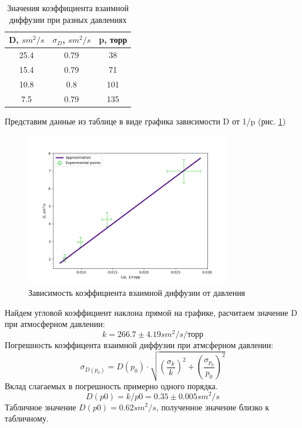 \documentclass[a4paper,12pt]{article} %
\begin{document}
\begin{table} \label{D} \caption{Значения коэффициента взаимной диффузии при разных давлениях} 
\begin{tabular}{|c|c|c|} \hline D, $sm^2/s$&	$\sigma_D$, $sm^2/s$ & p, торр \\ \hline 
25.4 & 0.79 & 38 \\ \hline
15.4 & 0.79 & 71  \\ \hline
10.8 & 0.8 & 101 \\ \hline
7.5  & 0.79 & 135 \\ \hline 
\end{tabular} \end{table}
Представим данные из таблице в виде графика зависимости D от 1/p (рис. \ref{D_p})

\begin{figure}[h!]
\begin{center}
\includegraphics[width=0.8\textwidth]{D(p)}
\end{center}
\caption{Зависимость коэффициента взаимной диффузии от давления} \label{D_p}
\end{figure}

Найдем угловой коэффициент наклона прямой на графике, расчитаем значение D при атмосферном давлении:
\begin{equation}
k = 266.7 \pm 4.19 sm^2/s/\text{торр}
\end{equation}
Погрешность коэффицента взаимной диффузии при атмсферном давлении:
\begin{equation}
\sigma_{D(p_0)}=D(p_0)\cdot \sqrt{(\frac{\sigma_k}{k})^2
+(\frac{\sigma_{p_0}}{p_0})^2}
\end{equation}
Вклад слагаемых в погрешность примерно одного порядка.
\begin{equation}
D(p0)=k/p0=0.35 \pm 0.005 sm^2/s
\end{equation} 
Табличное значение $D(p0) = 0.62 sm^2/s$, полученное значение близко к табличному.
\end{document}
